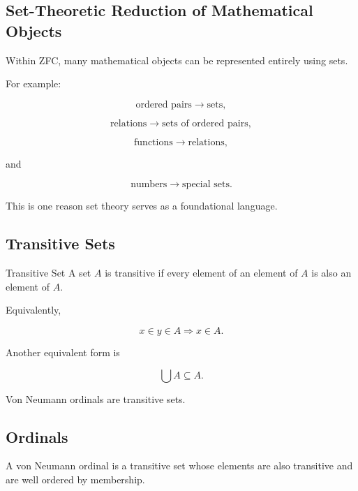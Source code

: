 \subsection{Set-Theoretic Reduction of Mathematical Objects}
\label{subsec:set-theoretic-reduction}

Within ZFC, many mathematical objects can be represented entirely using
sets.

For example:

\[
\boxed{
\text{ordered pairs}
\rightarrow
\text{sets},
}
\]

\[
\boxed{
\text{relations}
\rightarrow
\text{sets of ordered pairs},
}
\]

\[
\boxed{
\text{functions}
\rightarrow
\text{relations},
}
\]

and

\[
\boxed{
\text{numbers}
\rightarrow
\text{special sets}.
}
\]

This is one reason set theory serves as a foundational language.

\subsection{Transitive Sets}
\label{subsec:transitive-sets}

\begin{definitionbox}{Transitive Set}
A set \(A\) is transitive if every element of an element of \(A\) is also
an element of \(A\).

Equivalently,

\[
\boxed{
x\in y\in A
\Longrightarrow
x\in A.
}
\]

Another equivalent form is

\[
\boxed{
\bigcup A
\subseteq
A.
}
\]
\end{definitionbox}

Von Neumann ordinals are transitive sets.

\subsection{Ordinals}
\label{subsec:ordinals}

A von Neumann ordinal is a transitive set whose elements are also
transitive and are well ordered by membership.

